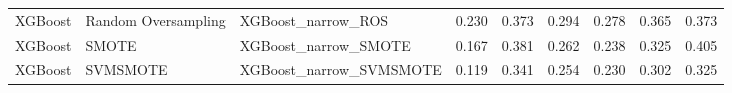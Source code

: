 \begin{tabular}{lllllllll}
                     XGBoost & Random Oversampling &                           XGBoost\_narrow\_ROS & 0.230 &                     0.373 &                 0.294 &                  0.278 &                                   0.365 &     0.373 \\
                     XGBoost &               SMOTE &                         XGBoost\_narrow\_SMOTE & 0.167 &                     0.381 &                 0.262 &                  0.238 &                                   0.325 &     0.405 \\
                     XGBoost &            SVMSMOTE &                      XGBoost\_narrow\_SVMSMOTE & 0.119 &                     0.341 &                 0.254 &                  0.230 &                                   0.302 &     0.325 \\
\bottomrule
\end{tabular}
